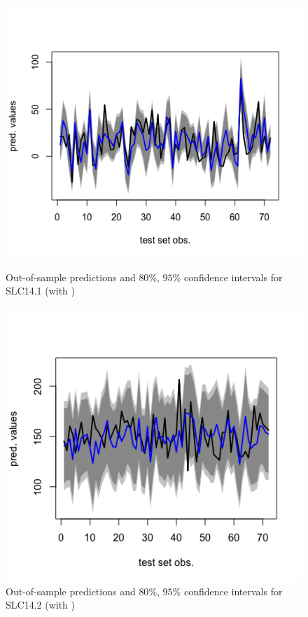 \begin{figure}[!htb]
    \centering
    \begin{minipage}{.5\textwidth}
        \centering
        \includegraphics[width=1.064\linewidth, height=0.35\textheight]{gfx/chapter-bayesianrvfl/SLC14_1.png}
        \caption{Out-of-sample predictions and $80$\%, $95$\% confidence intervals for SLC14.1 (with )}
        \label{oos_SLC14_1_seed123}
    \end{minipage}%
    \begin{minipage}{0.5\textwidth}
        \centering
        \includegraphics[width=1.064\linewidth, height=0.35\textheight]{gfx/chapter-bayesianrvfl/SLC14_2.png}
        \caption{Out-of-sample predictions and $80$\%, $95$\% confidence intervals for SLC14.2 (with )}
        \label{gfx/chapter-bayesianrvfl/oos_SLC14_2_seed123}
    \end{minipage}
\end{figure}
